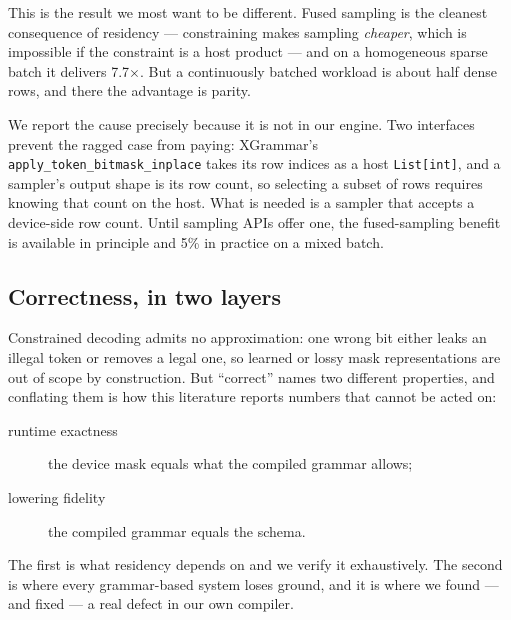 \documentclass{article}
\begin{document}
This is the result we most want to be different. Fused
sampling is the cleanest consequence of residency --- constraining makes sampling
\emph{cheaper}, which is impossible if the constraint is a host product --- and on
a homogeneous sparse batch it delivers 7.7$\times$. But a continuously batched
workload is about half dense rows, and there the advantage is parity.

We report the cause precisely because it is not in our engine. Two interfaces
prevent the ragged case from paying: XGrammar's
\texttt{apply\_token\_bitmask\_inplace} takes its row indices as a host
\texttt{List[int]}, and a sampler's output shape is its row count, so selecting a
subset of rows requires knowing that count on the host. What is needed is a
sampler that accepts a device-side row count. Until sampling APIs offer one, the
fused-sampling benefit is available in principle and 5\% in practice on a mixed
batch.

\subsection{Correctness, in two layers}
\label{sec:correctness}

Constrained decoding admits no approximation: one wrong bit either leaks an
illegal token or removes a legal one, so learned or lossy mask representations
are out of scope by construction. But ``correct'' names two different
properties, and conflating them is how this literature reports numbers that
cannot be acted on:

\begin{description}
\item[runtime exactness] the device mask equals what the compiled grammar
allows;
\item[lowering fidelity] the compiled grammar equals the schema.
\end{description}

The first is what residency depends on and we verify it exhaustively. The
second is where every grammar-based system loses ground, and it is where we
found --- and fixed --- a real defect in our own compiler.
\end{document}
